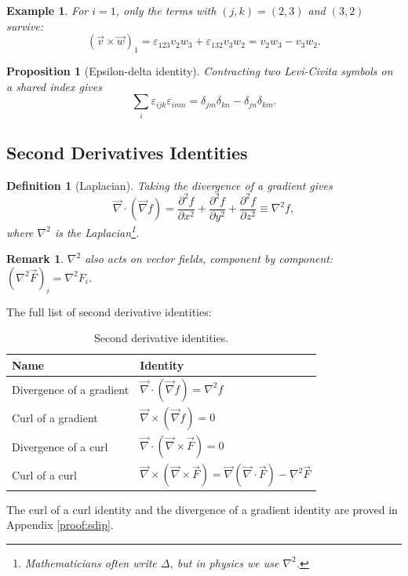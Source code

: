 \documentclass{article}
\newtheorem{definition}{Definition}
\newtheorem*{example}{Example}
\newtheorem{remark}{Remark}
\newtheorem{proposition}{Proposition}
\begin{document}
\begin{example}
    For $i = 1$, only the terms with $(j,k) = (2,3)$ and $(3,2)$ survive:
    \[(\vec{v}\times\vec{w})_1 = \varepsilon_{123}v_2w_3 + \varepsilon_{132}v_3w_2 = v_2w_3 - v_3w_2.\]
\end{example}
\begin{proposition}[Epsilon-delta identity]
    \label{Epsilon-delta-id}
    Contracting two Levi-Civita symbols on a shared index gives
    \[\sum_i \varepsilon_{ijk}\varepsilon_{imn} = \delta_{jm}\delta_{kn} - \delta_{jn}\delta_{km}.\]
\end{proposition}

\subsection{Second Derivatives Identities}
\begin{definition}[Laplacian]
    Taking the divergence of a gradient gives
    \begin{equation}
        \vec{\nabla}\cdot(\vec{\nabla}f) = \frac{\partial^2 f}{\partial x^2} + \frac{\partial^2 f}{\partial y^2} + \frac{\partial^2 f}{\partial z^2} \equiv \nabla^2 f,
    \end{equation}
    where $\nabla^2$ is the Laplacian\footnote{Mathematicians often write $\Delta$, but in physics we use $\nabla^2$.}.
\end{definition}
\begin{remark}
    $\nabla^2$ also acts on vector fields, component by component: $(\nabla^2\vec{F})_i = \nabla^2 F_i$.
\end{remark}
The full list of second derivative identities:
\begin{table}[H]
    \centering
    \renewcommand{\arraystretch}{1.4}
    \begin{tabular}{l|l}
        \toprule
        \textbf{Name} & \textbf{Identity} \\
        \midrule
        Divergence of a gradient & $\vec{\nabla}\cdot(\vec{\nabla}f) = \nabla^2 f$ \\
        Curl of a gradient & $\vec{\nabla}\times(\vec{\nabla}f) = 0$ \\
        Divergence of a curl & $\vec{\nabla}\cdot(\vec{\nabla}\times\vec{F}) = 0$ \\
        Curl of a curl & $\vec{\nabla}\times(\vec{\nabla}\times\vec{F}) = \vec{\nabla}(\vec{\nabla}\cdot\vec{F}) - \nabla^2\vec{F}$ \\
        \bottomrule
    \end{tabular}
    \caption{Second derivative identities.}
\end{table}
The curl of a curl identity and the divergence of a gradient identity are proved in Appendix \ref{proof:sdip}.
\end{document}
